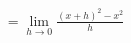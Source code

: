 \documentclass[preview]{standalone}
\begin{document}
\begin{align*}
= \lim_{h \to 0} \frac{(x+h)^2 - x^2}{h}
\end{align*}
\end{document}
